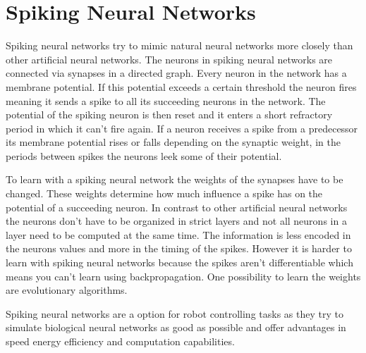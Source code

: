 \section{Spiking Neural Networks}
\label{sec:spiking}
Spiking neural networks try to mimic natural neural networks more closely than other artificial neural networks.
The neurons in spiking neural networks are connected via synapses in a directed graph.
Every neuron in the network has a membrane potential.
If this potential exceeds a certain threshold the neuron fires meaning it sends a spike to all its succeeding neurons in the network.
The potential of the spiking neuron is then reset and it enters a short refractory period in which it can't fire again.
If a neuron receives a spike from a predecessor its membrane potential rises or falls depending on the synaptic weight, in the periods between spikes the neurons leek some of their potential\cite{b1}.

To learn with a spiking neural network the weights of the synapses have to be changed.
These weights determine how much influence a spike has on the potential of a succeeding neuron.
In contrast to other artificial neural networks the neurons don't have to be organized in strict layers and not all neurons in a layer need to be computed at the same time.
The information is less encoded in the neurons values and more in the timing of the spikes\cite{b2}.
However it is harder to learn with spiking neural networks because the spikes aren't differentiable which means you can't learn using backpropagation.
One possibility to learn the weights are evolutionary algorithms.

Spiking neural networks are a option for robot controlling tasks as they try to simulate biological neural networks as good as possible and offer advantages in speed energy efficiency and computation capabilities\cite{b3}.